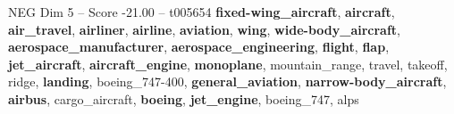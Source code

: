 \begin{textsample}{NEG Dim 5 – Score -21.00 – t005654}  \label{ex:f5_neg_011}
\textbf{fixed-wing\_aircraft}, \textbf{aircraft}, \textbf{air\_travel}, \textbf{airliner}, \textbf{airline}, \textbf{aviation}, \textbf{wing}, \textbf{wide-body\_aircraft}, \textbf{aerospace\_manufacturer}, \textbf{aerospace\_engineering}, \textbf{flight}, \textbf{flap}, \textbf{jet\_aircraft}, \textbf{aircraft\_engine}, \textbf{monoplane}, mountain\_range, travel, takeoff, ridge, \textbf{landing}, boeing\_747-400, \textbf{general\_aviation}, \textbf{narrow-body\_aircraft}, \textbf{airbus}, cargo\_aircraft, \textbf{boeing}, \textbf{jet\_engine}, boeing\_747, alps

\end{textsample}
